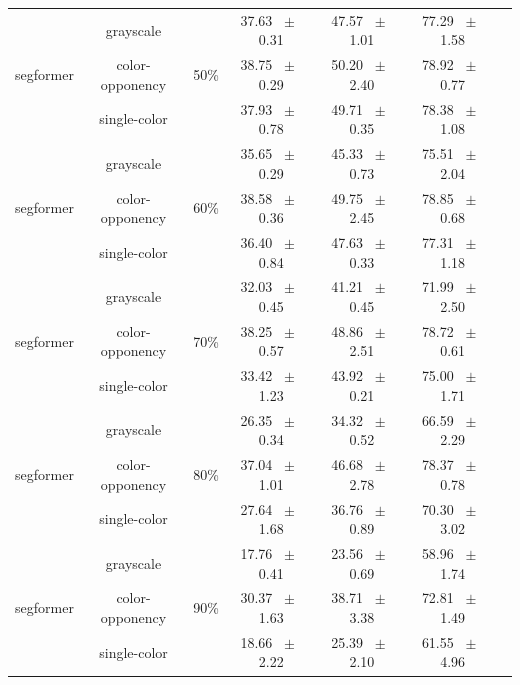 \begin{table}[h]
\begin{tabular}{@{}lccc ccc@{}}
    \midrule
    \multirow{3}{*}{segformer} & grayscale & \multirow{3}{*}{50\%} & 37.63 ~$\pm$~ 0.31 & 47.57 ~$\pm$~ 1.01 & 77.29 ~$\pm$~ 1.58 \\
    & color-opponency &  & 38.75 ~$\pm$~ 0.29 & 50.20 ~$\pm$~ 2.40 & 78.92 ~$\pm$~ 0.77 \\
    & single-color &  & 37.93 ~$\pm$~ 0.78 & 49.71 ~$\pm$~ 0.35 & 78.38 ~$\pm$~ 1.08 \\
    \midrule
    \multirow{3}{*}{segformer} & grayscale & \multirow{3}{*}{60\%} & 35.65 ~$\pm$~ 0.29 & 45.33 ~$\pm$~ 0.73 & 75.51 ~$\pm$~ 2.04 \\
    & color-opponency &  & 38.58 ~$\pm$~ 0.36 & 49.75 ~$\pm$~ 2.45 & 78.85 ~$\pm$~ 0.68 \\
    & single-color &  & 36.40 ~$\pm$~ 0.84 & 47.63 ~$\pm$~ 0.33 & 77.31 ~$\pm$~ 1.18 \\
    \midrule
    \multirow{3}{*}{segformer} & grayscale & \multirow{3}{*}{70\%} & 32.03 ~$\pm$~ 0.45 & 41.21 ~$\pm$~ 0.45 & 71.99 ~$\pm$~ 2.50 \\
    & color-opponency &  & 38.25 ~$\pm$~ 0.57 & 48.86 ~$\pm$~ 2.51 & 78.72 ~$\pm$~ 0.61 \\
    & single-color &  & 33.42 ~$\pm$~ 1.23 & 43.92 ~$\pm$~ 0.21 & 75.00 ~$\pm$~ 1.71 \\
    \midrule
    \multirow{3}{*}{segformer} & grayscale & \multirow{3}{*}{80\%} & 26.35 ~$\pm$~ 0.34 & 34.32 ~$\pm$~ 0.52 & 66.59 ~$\pm$~ 2.29 \\
    & color-opponency &  & 37.04 ~$\pm$~ 1.01 & 46.68 ~$\pm$~ 2.78 & 78.37 ~$\pm$~ 0.78 \\
    & single-color &  & 27.64 ~$\pm$~ 1.68 & 36.76 ~$\pm$~ 0.89 & 70.30 ~$\pm$~ 3.02 \\
    \midrule
    \multirow{3}{*}{segformer} & grayscale & \multirow{3}{*}{90\%} & 17.76 ~$\pm$~ 0.41 & 23.56 ~$\pm$~ 0.69 & 58.96 ~$\pm$~ 1.74 \\
    & color-opponency &  & 30.37 ~$\pm$~ 1.63 & 38.71 ~$\pm$~ 3.38 & 72.81 ~$\pm$~ 1.49 \\
    & single-color &  & 18.66 ~$\pm$~ 2.22 & 25.39 ~$\pm$~ 2.10 & 61.55 ~$\pm$~ 4.96 \\
    \midrule
    \bottomrule
  \end{tabular}
  \label{tab:sparse_results_segformer_acdc_full}
\end{table}